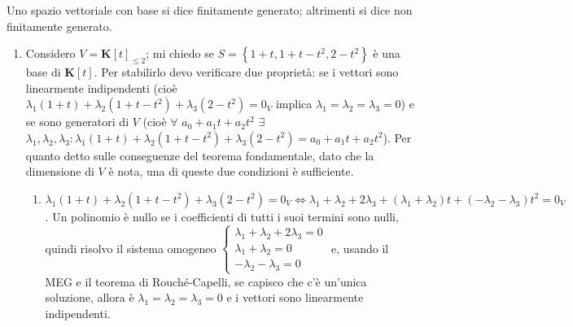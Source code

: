 \documentclass{article}
\begin{document}
Uno spazio vettoriale con base si dice finitamente generato; altrimenti si
dice non finitamente generato.

\begin{enumerate}
\item Considero $V=\mathbf{K}\left[ t\right] _{\leq 2}$; mi chiedo se $%
S=\left\{ 1+t,1+t-t^{2},2-t^{2}\right\} $ \`{e} una base di $\mathbf{K}\left[
t\right] $. Per stabilirlo devo verificare due propriet\`{a}: se i vettori
sono linearmente indipendenti (cio\`{e} $\lambda _{1}\left( 1+t\right)
+\lambda _{2}\left( 1+t-t^{2}\right) +\lambda _{3}\left( 2-t^{2}\right)
=0_{V}$ implica $\lambda _{1}=\lambda _{2}=\lambda _{3}=0$) e se sono
generatori di $V$ (cio\`{e} $\forall $ $a_{0}+a_{1}t+a_{2}t^{2}$ $\exists $ $%
\lambda _{1},\lambda _{2},\lambda _{3}:\lambda _{1}\left( 1+t\right)
+\lambda _{2}\left( 1+t-t^{2}\right) +\lambda _{3}\left( 2-t^{2}\right)
=a_{0}+a_{1}t+a_{2}t^{2}$). Per quanto detto sulle conseguenze del teorema
fondamentale, dato che la dimensione di $V$ \`{e} nota, una di queste due
condizioni \`{e} sufficiente.

\begin{enumerate}
\item $\lambda _{1}\left( 1+t\right) +\lambda _{2}\left( 1+t-t^{2}\right)
+\lambda _{3}\left( 2-t^{2}\right) =0_{V}\Longleftrightarrow \lambda
_{1}+\lambda _{2}+2\lambda _{3}+\left( \lambda _{1}+\lambda _{2}\right)
t+\left( -\lambda _{2}-\lambda _{3}\right) t^{2}=0_{V}$. Un polinomio \`{e}
nullo se i coefficienti di tutti i suoi termini sono nulli, quindi risolvo
il sistema omogeneo $\left\{ 
\begin{array}{c}
\lambda _{1}+\lambda _{2}+2\lambda _{3}=0 \\ 
\lambda _{1}+\lambda _{2}=0 \\ 
-\lambda _{2}-\lambda _{3}=0%
\end{array}%
\right. $ e, usando il MEG e il teorema di Rouch\'{e}-Capelli, se capisco
che c'\`{e} un'unica soluzione, allora \`{e} $\lambda _{1}=\lambda
_{2}=\lambda _{3}=0$ e i vettori sono linearmente indipendenti.


\end{enumerate}
\end{enumerate}
\end{document}
